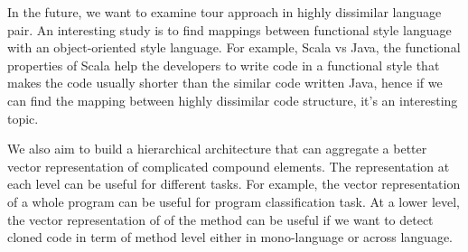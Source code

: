 In the future, we want to examine tour approach in highly dissimilar language pair. An interesting study is to find mappings between functional style language with an object-oriented style language. For example, Scala vs Java, the functional properties of Scala help the developers to write code in a functional style that makes the code usually shorter than the similar code written Java, hence if we can find the mapping between highly dissimilar code structure, it's an interesting topic.

We also aim to build a hierarchical architecture that can aggregate a better vector representation of complicated compound elements. The representation at each level can be useful for different tasks. For example, the vector representation of a whole program can be useful for program classification task. At a lower level, the vector representation of of the method can be useful if we want to detect cloned code in term of method level either in mono-language or across language.



\begin{acks}
	
\end{acks}
